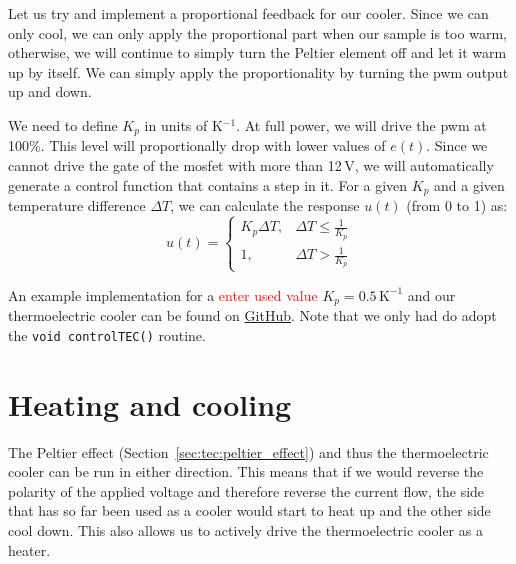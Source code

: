 Let us try and implement a proportional feedback for our cooler. Since we can only cool, we can only apply the proportional part when our sample is too warm, otherwise, we will continue to simply turn the Peltier element off and let it warm up by itself. We can simply apply the proportionality by turning the \ac{pwm} output up and down. 

We need to define $K_p$ in units of K$^{-1}$. At full power, we will drive the \ac{pwm} at 100\%. This level will proportionally drop with lower values of $e(t)$. Since we cannot drive the gate of the \ac{mosfet} with more than 12\,V, we will automatically generate a control function that contains a step in it. For a given $K_p$ and a given temperature difference $\Delta T$, we can calculate the response $u(t)$ (from 0 to 1) as:
\begin{equation}
  u(t) = \left\{ 
    \begin{array}{ll}
      K_p \Delta T,   & \Delta T \leq \frac{1}{K_p} \\
      1,              & \Delta T > \frac{1}{K_p}
    \end{array}
  \right.
\end{equation}

An example implementation for a \textcolor{red}{enter used value} $K_p = 0.5\,\mathrm{K}^{-1}$ and our thermoelectric cooler can be found on \href{https://github.com/galactic-forensics/workshop_arduino_electronics/tree/main/further_examples/p_control}{GitHub}. Note that we only had do adopt the \lstinline{void controlTEC()} routine.




\section{Heating and cooling}

The Peltier effect (Section~\ref{sec:tec:peltier_effect}) and thus the thermoelectric cooler can be run in either direction. This means that if we would reverse the polarity of the applied voltage and therefore reverse the current flow, the side that has so far been used as a cooler would start to heat up and the other side cool down. This also allows us to actively drive the thermoelectric cooler as a heater.

